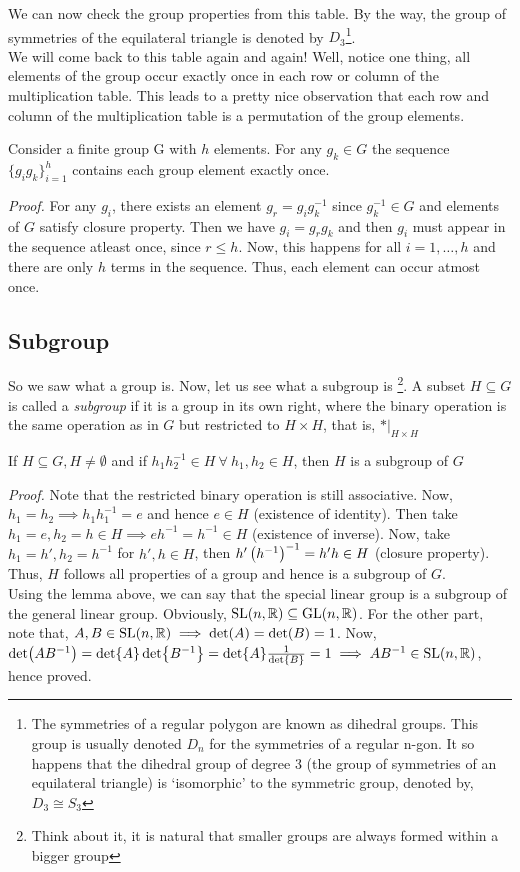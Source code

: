 \noindent
We can now check the group properties from this table. By the way, the group of symmetries of the equilateral triangle is denoted by $D_3$\footnote{The symmetries of a regular polygon are known as dihedral groups. This group is usually denoted $D_n$ for the symmetries of a regular n-gon. It so happens that the dihedral group of degree 3 (the group of symmetries of an equilateral triangle) is `isomorphic' to the symmetric group, denoted by, $D_3 \cong S_3$}.\\[0.3cm]We will come back to this table again and again! Well, notice one thing, all elements of the group occur exactly once in each row or column of the multiplication table. This leads to a pretty nice observation that each row and column of the multiplication table is a permutation of the group elements. 
\begin{ffact}
Consider a finite group G with $h$ elements. For any $g_k\in G$ the sequence $\{g_ig_k\}_{i=1}^h$ contains each group element exactly once. 
\end{ffact}
\textit{Proof.} For any $g_i$, there exists an element $g_r = g_ig_k^{-1}$ since $g_k^{-1}\in G$ and elements of $G$ satisfy closure property. Then we have $g_i = g_r g_k$ and then $g_i$ must appear in the sequence atleast once, since $r\leq h$. Now, this happens for all $i=1,\ldots,h$ and there are only $h$ terms in the sequence. Thus, each element can occur atmost once.
\subsection{Subgroup}
So we saw what a group is. Now, let us see what a subgroup is \footnote{Think about it, it is natural that smaller groups are always formed within a bigger group}. A subset $H\subseteq G$ is called a \textit{subgroup} if it is a group in its own right, where the binary operation is the same operation as in $G$ but restricted to $H\times H$, that is, $*\Big|_{H\times H}$
\begin{lemma}\label{lem:subgroup}
    If $H\subseteq G, H \neq \emptyset$ and if $h_1h_2^{-1}\in H\ \forall \ h_1,h_2\in H$, then $H$ is a subgroup of $G$
\end{lemma}
\textit{Proof.} Note that the restricted binary operation is still associative. Now, $h_1 = h_2 \implies h_1 h_1^{-1} = e$ and hence $e\in H$ (existence of identity). Then take $h_1 =e, h_2 = h \in H \implies eh^{-1} = h^{-1}\in H$ (existence of inverse). Now, take $h_1 = h', h_2 = h^{-1}$ for $h', h\in H$, then $h'\left( h^{-1} \right)^{-1}=h'h\in H$ (closure property). Thus, $H$ follows all properties of a group and hence is a subgroup of $G$.\\[0.3cm]
Using the lemma above, we can say that the special linear group is a subgroup of the general linear group. Obviously, $\mathrm{SL}(n,\mathbb{R})\subseteq \mathrm{GL}(n,\mathbb{R})$.  For the other part, note that,  $A,B\in \mathrm{SL}(n,\mathbb{R})\implies \det(A) = \det(B)=1$. Now, $\det(AB^{-1}) = \det{A}\det{B^{-1}} = \det{A}\frac{1}{\det{B}} = 1 \implies AB^{-1}\in \mathrm{SL}(n,\mathbb{R})$, hence proved.

